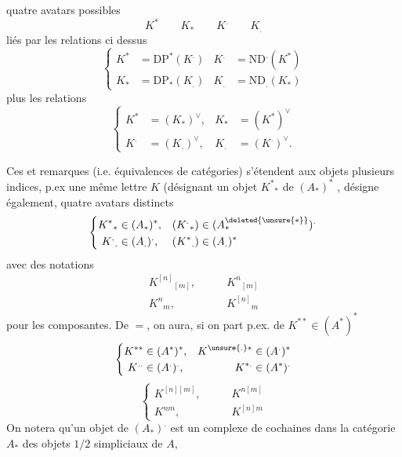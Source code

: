 quatre avatars possibles
\[
 K^*\qquad K_*\qquad K^{.}\qquad K_.
\]
liés par les relations ci dessus
\[
 \left\{\begin{aligned}
 K^*&=\mathrm{DP}^*(K^{.}) & K^{.}&=\mathrm{ND}^{.}(K^*)\\
 K_*&=\mathrm{DP}_*(K_.) & K_.&=\mathrm{ND}_ .(K_*)
 \end{aligned}\right.
\]
plus les relations
\[
 \left\{\begin{aligned}
 K^*&=(K_*)^\vee, & K_*&=(K^*)^\vee\\
 K^{.}&=(K_.)^\vee, & K_.&=(K^{.})^\vee .
 \end{aligned}\right.
\]

Ces   et remarques (i.e. équivalences de catégories) s'étendent aux objets   plusieurs indices, p.ex  une même lettre $K$ (désignant  un objet $K^*{}_*$ de $(A_*)^*$ , désigne également,  quatre avatars distincts
\[
 \left\{\begin{aligned}
 K^*{}_*&\in(A_*)^*, & (K^{.}{}_*)&\in(A_*^{\deleted{\unsure{*}}})^{.}\\
 K^{.}{}_.&\in(A_.)^{.}, &(K^*{}_.)&\in(A_.)^*
 \end{aligned}\right.
\]
avec des notations
\[
 \begin{aligned}
 K^{[n]}{}_{[m]},&\qquad K^n{}_{[m]}\\
 K^n{}_{m},&\qquad K^{[n]}{}_{m}
 \end{aligned}
\]
pour les composantes. De $=$, on aura, si on part p.ex. de $K^{**}\in(A^*)^*$
\[
 \left\{\begin{aligned}
 K^{**}&\in(A^*)^*, &K^{\unsure{.}*}&\in(A^{.})^*\\
 K^{..}&\in(A^{.})^{.}, &K^{*.}&\in(A^*)^{.}
 \end{aligned}\right.
\]
\[
 \left\{\begin{aligned}
 K^{[n][m]},&\qquad K^{n[m]}\\
 K^{nm},&\qquad K^{[n]m}
 \end{aligned}\right.
\]
On notera qu'un objet de $(A_*)^{.}$ est un complexe de cochaines  dans la catégorie $A_*$ des objets $1/2$ simpliciaux de $A$,

